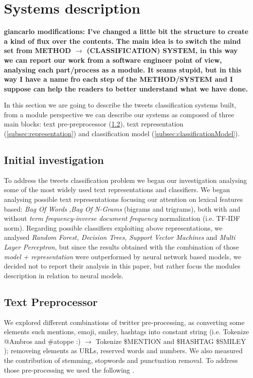 \section{Systems description} \label{sec:methods}

\textbf{giancarlo modifications: I've changed a little bit the structure to create a kind of flux over the contents. The main idea is to switch the mind set from METHOD $\rightarrow$ (CLASSIFICATION) SYSTEM, in this way we can report our work from a software engineer point of view, analysing each part/process as a module. It seams stupid, but in this way I have a name fro each step of the METHOD/SYSTEM and I suppose can help the readers to better understand what we have done.}


In this section we are going to describe the tweets classification systems built, from a module perspective we can describe our systems as composed of three main blocks: text pre-preprocessor (\cref{subsec:preprocessing}),  text representation (\cref{subsec:representation}) and classification model (\cref{subsec:classificationModel}). 


\subsection{Initial investigation} \label{subsec:boh}
To address the tweets classification problem we began our investigation analysing some of the most widely used text representations and classifiers.
We began analysing possible text representations focusing our attention on lexical features based: \emph{Bag Of Words} \cite{harris1954distributional},\emph{Bag Of N-Grams} (bigrams and trigrams), both with and without \emph{term frequency-inverse document frequency} normalization (i.e. TF-IDF norm).
Regarding possible classifiers exploiting above representations,  we analysed \emph{Random Forest, Decision Trees, Support Vector Machines} and \emph{Multi Layer Perceptron}, but since the results obtained with the combination of those \emph{model + representation} were outperformed by neural network based models, we decided not to report their analysis in this paper, but rather focus the modules description in relation to neural models.


\subsection{Text Preprocessor} \label{subsec:preprocessing}


We explored different combinations of twitter pre-processing, as converting some elements such mentions, emoji, smiley, hashtags into constant string (i.e. Tokenize @Ambros and \#atoppe :) $\rightarrow $ Tokenize \$MENTION and \$HASHTAG \$SMILEY ); removeing elements as URLs, reserved words and numbers.
We also measured the contribution of stemming, stopwords and punctuation removal.
To address those pre-processing we used the following \cite{nltk} \cite{tweets-preprocessor}.

